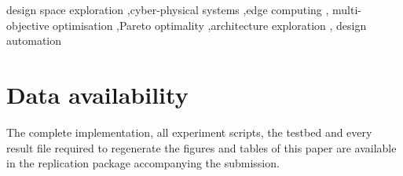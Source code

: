 \documentclass[preprint,11pt,3p]{elsarticle}
\theoremstyle{plain}
\theoremstyle{definition}
\begin{document}
\begin{frontmatter}
\begin{keyword}
design space exploration \sep cyber-physical systems \sep edge computing \sep
multi-objective optimisation \sep Pareto optimality \sep architecture exploration \sep
design automation
\end{keyword}

\end{frontmatter}











\FloatBarrier
\section*{Data availability}
The complete implementation, all experiment scripts, the testbed and every result file
required to regenerate the figures and tables of this paper are available in the
replication package accompanying the submission.



\end{document}
